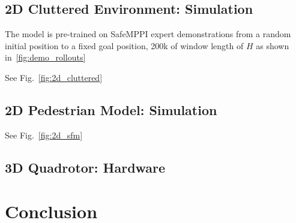 \documentclass[letterpaper, 10 pt, conference]{ieeeconf}
\begin{document}
\subsection{2D Cluttered Environment: Simulation}

The model is pre-trained on SafeMPPI expert demonstrations from a random initial position to a fixed goal position, 200k of window length of $H$ as shown in~\ref{fig:demo_rollouts}

See Fig.~\ref{fig:2d_cluttered}
\subsection{2D Pedestrian Model: Simulation}
See Fig.~\ref{fig:2d_sfm}

\subsection{3D Quadrotor: Hardware}


\section{Conclusion}





\end{document}
